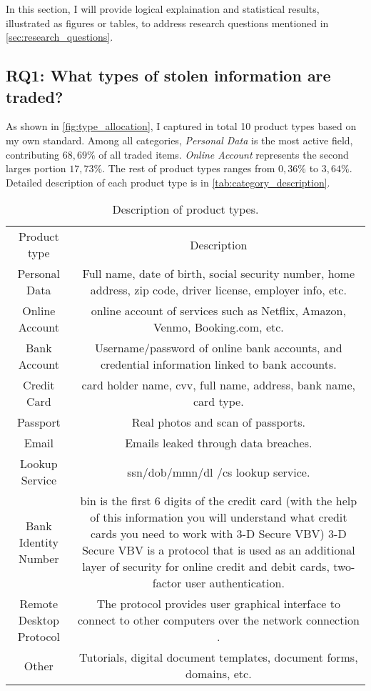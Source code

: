 In this section, I will provide logical explaination and statistical results,
illustrated as figures or tables, to address research questions mentioned in
\autoref{sec:research_questions}.

\subsection{RQ1: What types of stolen information are traded?}
As shown in \autoref{fig:type_allocation}, I captured in total 10 product types
based on my own standard. Among all categories, \emph{Personal Data} is the
most active field, contributing \(68,69\%\) of all traded items. \emph{Online Account}
represents the second larges portion \(17,73\%\). The rest of product types ranges
from \(0,36\%\) to \(3,64\%\). Detailed description of each product type is in
\autoref{tab:category_description}.

\begin{table}
    \centering
    \begin{tabular}{|c|c|}
        \hline
        Product type & Description\\
        Personal Data & Full name, date of birth, social security number, home
        address, zip code, driver license, employer info, etc.\\
        Online Account & online account of services such as Netflix, Amazon,
        Venmo, Booking.com, etc.\\
        Bank Account & Username/password of online bank accounts, and credential
        information linked to bank accounts.\\
        Credit Card & card holder name, \acrshort{cvv}, full name, address,
        bank name, card type.\\
        Passport & Real photos and scan of passports.\\
        Email & Emails leaked through data breaches.\\
        Lookup Service & \acrshort{ssn}/\acrshort{dob}/\acrshort{mmn}/\acrshort{dl}
        /\acrshort{cs} lookup service.\\
        Bank Identity Number & \acrshort{bin} is the first 6 digits of the credit card (with
        the help of this information you will understand what credit cards you need to
        work with 3-D Secure VBV) 3-D Secure VBV is a protocol that is used as an
        additional layer of security for online credit and debit cards, two-factor
        user authentication.\\
        Remote Desktop Protocol & The protocol provides user graphical interface to connect
        to other computers over the network connection \cite{web:rdp_wiki}.\\
        Other & Tutorials, digital document templates, document forms, domains, etc.\\
        \hline
    \end{tabular}
    \caption{Description of product types.}\label{tab:category_description}
\end{table}


